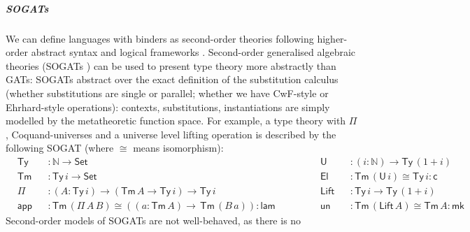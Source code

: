 \documentclass[a4paper,UKenglish]{article}
\newcommand{\ra}{\rightarrow}
\newcommand{\Set}{\mathsf{Set}}
\newcommand{\Ty}{\mathsf{Ty}}
\newcommand{\Tm}{\mathsf{Tm}}
\newcommand{\N}{\mathbb{N}}
\newcommand{\lam}{\mathsf{lam}}
\newcommand{\app}{\mathsf{app}}
\newcommand{\U}{\mathsf{U}}
\newcommand{\El}{\mathsf{El}}
\newcommand{\cd}{\mathsf{c}}
\newcommand{\blank}{\mathord{\hspace{1pt}\text{--}\hspace{1pt}}} %
\renewcommand{\tt}{\mathsf{tt}}
\newcommand{\fst}{\mathsf{fst}}
\newcommand{\snd}{\mathsf{snd}}
\newcommand{\Lift}{\mathsf{Lift}}
\newcommand{\mk}{\mathsf{mk}}
\newcommand{\un}{\mathsf{un}}
\begin{document}
\vspace{-1.1em}
\subparagraph*{SOGATs}
We can define languages with binders as second-order theories
following higher-order abstract syntax \cite{DBLP:conf/lics/Hofmann99}
and logical frameworks
\cite{DBLP:journals/jacm/HarperHP93,10.1007/978-3-642-14203-1_2}. Second-order
generalised algebraic theories (SOGATs
\cite{uemura,DBLP:conf/fscd/KaposiX24}) can be used to present type
theory more abstractly than GATs: SOGATs abstract over the exact
definition of the substitution calculus (whether substitutions are
single or parallel; whether we have CwF-style or Ehrhard-style
operations): contexts, substitutions, instantiations are simply
modelled by the metatheoretic function space. For example, a type
theory with $\Pi$, Coquand-universes and a universe level lifting
operation is described by the following SOGAT (where $\cong$ means
isomorphism):
\begin{equation}\label{eq:tt}
\begin{alignedat}{10}
  & \Ty && : \N\ra\Set                                                             && \U && : (i:\N)\ra\Ty\,(1+i) \\           
  & \Tm && : \Ty\,i\ra\Set                                                         && \El && : \Tm\,(\U\,i)\cong\Ty\,i : \cd \\
  & \Pi && : (A:\Ty\,i)\ra(\Tm\,A\ra\Ty\,i)\ra\Ty\,i                               && \Lift && : \Ty\,i\ra\Ty\,(1+i) \\        
  & \app && : \Tm\,(\Pi\,A\,B)\cong((a:\Tm\,A)\ra\,\Tm\,(B\,a)): \lam \hspace{3em} && \un && : \Tm\,(\Lift\,A)\cong\Tm\,A : \mk
\end{alignedat}
\end{equation}
Second-order models of SOGATs are not well-behaved, as there is no
\end{document}
